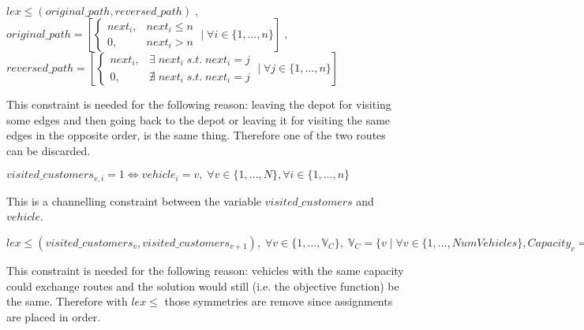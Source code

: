 \documentclass[../main.tex]{subfiles}
\begin{document}
\begin{center} %
    \begin{math}
        lex\leq(original\_path, reversed\_path) \; ,
    \end{math}\\
    \begin{math}
        original\_path = [
            \begin{cases}
                next_i, & next_i \leq n\\
                0, & next_i > n
            \end{cases} \; | \; \forall{} i \in \{1,\dots,n\}
        ] \; ,
    \end{math}\\
    \begin{math}
        reversed\_path = [
            \begin{cases}
                next_i, & \exists \; next_i \; s.t. \; next_i = j\\
                0, & \nexists \;  next_i \; s.t. \; next_i = j
            \end{cases} \; | \; \forall{} j \in \{1,\dots,n\}
        ]
    \end{math}
\end{center}
This constraint is needed for the following reason: leaving the depot for visiting some edges and then going back to the depot or leaving it for visiting the same edges in the opposite order, is the same thing. Therefore one of the two routes can be discarded.

\begin{center} %
    \begin{math}
        visited\_customers_{v,i} = 1 \Leftrightarrow vehicle_i = v, \; \forall v \in \{1,\dots,N\}, \forall i \in \{1,\dots,n\}
    \end{math}
\end{center}
This is a channelling constraint between the variable $visited\_customers$ and $vehicle$.

\begin{center} %
    \begin{math}
        lex\leq(visited\_customers_{v}, visited\_customers_{v+1}), \;
        \forall v \in \{1,\dots,\mathbb{V}_{C}\}, \;
        \mathbb{V}_{C} = \{v \; | \; \forall v \in \{1,\dots,NumVehicles\}, Capacity_v = c\}, \;
        \forall c \in Capacity
    \end{math}
\end{center}
This constraint is needed for the following reason: vehicles with the same capacity could exchange routes and the solution would still (i.e. the objective function) be the same. Therefore with $lex\leq$ those symmetries are remove since assignments are placed in order.
\end{document}
